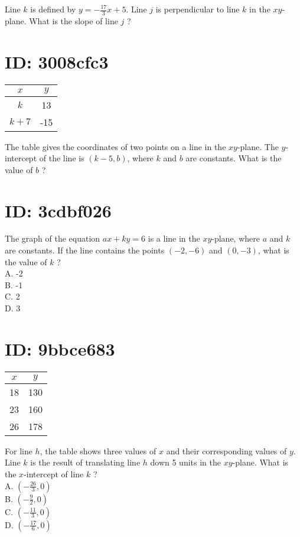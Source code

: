 

Line $k$ is defined by $y=-\frac{17}{3} x+5$. Line $j$ is perpendicular to line $k$ in the $x y$-plane. What is the slope of line $j$ ?

\section*{ID: 3008cfc3}
\begin{center}
\begin{tabular}{|c|c|}
\hline
$x$ & $y$ \\
\hline
$k$ & 13 \\
\hline
$k+7$ & -15 \\
\hline
\end{tabular}
\end{center}

The table gives the coordinates of two points on a line in the $x y$-plane. The $y$-intercept of the line is $(k-5, b)$, where $k$ and $b$ are constants. What is the value of $b$ ?

\section*{ID: 3cdbf026}
The graph of the equation $a x+k y=6$ is a line in the $x y$-plane, where $a$ and $k$ are constants. If the line contains the points $(-2,-6)$ and $(0,-3)$, what is the value of $k$ ?\\
A. -2\\
B. -1\\
C. 2\\
D. 3

\section*{ID: 9bbce683}
\begin{center}
\begin{tabular}{|c|c|}
\hline
$x$ & $y$ \\
\hline
18 & 130 \\
\hline
23 & 160 \\
\hline
26 & 178 \\
\hline
\end{tabular}
\end{center}

For line $h$, the table shows three values of $x$ and their corresponding values of $y$. Line $k$ is the result of translating line $h$ down 5 units in the $x y$-plane. What is the $x$-intercept of line $k$ ?\\
A. $\left(-\frac{26}{3}, 0\right)$\\
B. $\left(-\frac{9}{2}, 0\right)$\\
C. $\left(-\frac{11}{3}, 0\right)$\\
D. $\left(-\frac{17}{6}, 0\right)$

